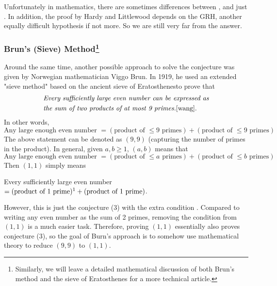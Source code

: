 \documentclass{article}
\begin{document}
Unfortunately in mathematics, there are sometimes differences between ,  and just . In addition, the proof by Hardy and Littlewood depends on the GRH, another equally difficult hypothesis if not more. So we are still very far from the answer.

\subsubsection*{Brun's (Sieve) Method\footnote{Similarly, we will leave a detailed mathematical discussion of both Brun’s method and the sieve of Eratosthenes for a more technical article.}}
Around the same time, another possible approach to solve the conjecture was given by Norwegian mathematician Viggo Brun. In 1919, he used an extended "sieve method" based on the ancient sieve of Eratosthenes\footnotemark[\value{footnote}] to prove that 
\begin{equation}
    \begin{aligned}
        &\emph{Every sufficiently large even number can be expressed as}\\
        &\emph{the sum of two products of at most 9 primes.}\cite{wang}.
    \end{aligned}
\end{equation} 
\noindent In other words, 
$$ \text{Any large enough even number } = (\text{product of $\leq 9$ primes}) + (\text{product of $\leq 9$ primes})$$
The above statement can be denoted as $(9, 9)$ (capturing the number of primes in the product). In general, given $a, b \geq 1$, $(a, b)$ means that
$$ \text{Any large enough even number } = (\text{product of $\leq a$ primes}) + (\text{product of $\leq b$ primes})$$
Then $(1,1)$ simply means
\begin{center}
    Every sufficiently large even number $ = (\text{product of 1 prime})\footnotemark{} + (\text{product of 1 prime})$.
\end{center}
However, this is just the conjecture (3) with the extra condition . Compared to writing any even number as the sum of 2 primes, removing the  condition from $(1,1)$ is a much easier task\cite{pan}. Therefore, proving $(1,1)$ essentially also proves conjecture (3), so the goal of Burn's approach is to somehow use mathematical theory to reduce $(9,9)$ to $(1,1)$.\vskip 2mm
\end{document}

